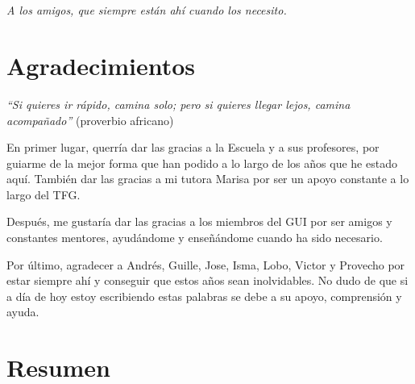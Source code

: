\documentclass[openright,twoside,10pt]{book}
\begin{document}
    \newpage
    \mbox{}	
    \thispagestyle{empty} %

    \chapter*{}

    \begin{flushright}
        \textit{%
        A los amigos, que siempre están ahí cuando los necesito.}
    \end{flushright}

    \chapter*{Agradecimientos} %

    \emph{``Si quieres ir rápido, camina solo; pero si quieres llegar lejos,
    camina acompañado''} (proverbio africano)
    
    En primer lugar, querría dar las gracias a la Escuela y a sus
    profesores, por guiarme de la mejor forma que han podido a lo largo de
    los años que he estado aquí. También dar las gracias a mi tutora Marisa
    por ser un apoyo constante a lo largo del TFG.
    
    Después, me gustaría dar las gracias a los miembros del GUI por ser
    amigos y constantes mentores, ayudándome y enseñándome cuando ha sido
    necesario.
    
    Por último, agradecer a Andrés, Guille, Jose, Isma, Lobo, Victor y
    Provecho por estar siempre ahí y conseguir que estos años sean
    inolvidables. No dudo de que si a día de hoy estoy escribiendo estas
    palabras se debe a su apoyo, comprensión y ayuda.

    \chapter*{Resumen} %
\end{document}
